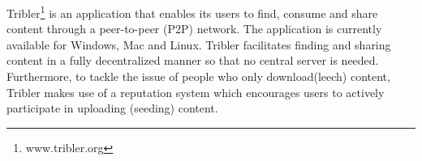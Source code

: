 Tribler\footnote{www.tribler.org} is an application that enables its users to find, consume and share content through a peer-to-peer (P2P) network. The application is currently available for Windows, Mac and Linux. Tribler facilitates finding and sharing content in a fully decentralized manner so that no central server is needed. Furthermore, to tackle the issue of people who only download(leech) content, Tribler makes use of a reputation system which encourages users to actively participate in uploading (seeding) content.